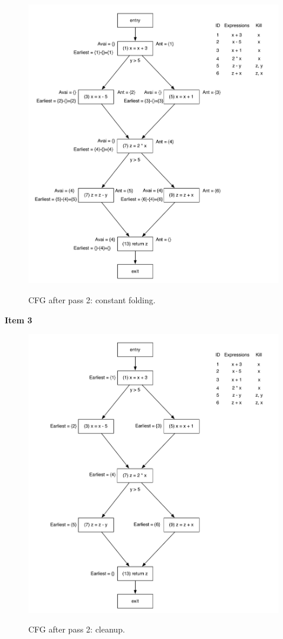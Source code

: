 \documentclass[12pt]{article}
\begin{document}
\begin{figure}[!htbp]
    \centering
    \caption{CFG after pass 2: constant folding.}
    \includegraphics[scale=0.65]{cfg2_2.pdf}
    \label{fig:cfg22}
\end{figure}

\pagebreak

\textbf{Item 3}

\begin{figure}[!htbp]
    \centering
    \caption{CFG after pass 2: cleanup.}
    \includegraphics[scale=0.65]{cfg3.pdf}
    \label{fig:cfg3}
\end{figure}
\end{document}
